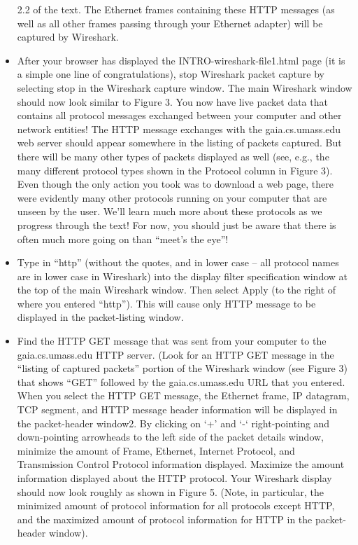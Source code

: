 \documentclass[11pt,a4paper]{article}
\begin{document}
\begin{itemize}
    2.2 of the text. The Ethernet frames containing these HTTP messages (as well as
    all other frames passing through your Ethernet adapter) will be captured by
    Wireshark.
    \item After your browser has displayed the INTRO-wireshark-file1.html page (it is a
    simple one line of congratulations), stop Wireshark packet capture by selecting
    stop in the Wireshark capture window. The main Wireshark window should now
    look similar to Figure 3. You now have live packet data that contains all protocol
    messages exchanged between your computer and other network entities! The
    HTTP message exchanges with the gaia.cs.umass.edu web server should appear
    somewhere in the listing of packets captured. But there will be many other types
    of packets displayed as well (see, e.g., the many different protocol types shown in
    the Protocol column in Figure 3). Even though the only action you took was to
    download a web page, there were evidently many other protocols running on your
    computer that are unseen by the user. We’ll learn much more about these
    protocols as we progress through the text! For now, you should just be aware that
    there is often much more going on than “meet’s the eye”!
    \item Type in “http” (without the quotes, and in lower case – all protocol names are in
    lower case in Wireshark) into the display filter specification window at the top of
    the main Wireshark window. Then select Apply (to the right of where you entered
    “http”). This will cause only HTTP message to be displayed in the packet-listing
    window.
    \item Find the HTTP GET message that was sent from your computer to the
    gaia.cs.umass.edu HTTP server. (Look for an HTTP GET message in the “listing
    of captured packets” portion of the Wireshark window (see Figure 3) that shows
    “GET” followed by the gaia.cs.umass.edu URL that you entered. When you
    select the HTTP GET message, the Ethernet frame, IP datagram, TCP segment,
    and HTTP message header information will be displayed in the packet-header
    window2. By clicking on ‘+’ and ‘-‘ right-pointing and down-pointing arrowheads
    to the left side of the packet details window, minimize the amount of Frame,
    Ethernet, Internet Protocol, and Transmission Control Protocol information
    displayed. Maximize the amount information displayed about the HTTP protocol.
    Your Wireshark display should now look roughly as shown in Figure 5. (Note, in
    particular, the minimized amount of protocol information for all protocols except
    HTTP, and the maximized amount of protocol information for HTTP in the
    packet-header window).
     
\end{itemize}
\end{document}

